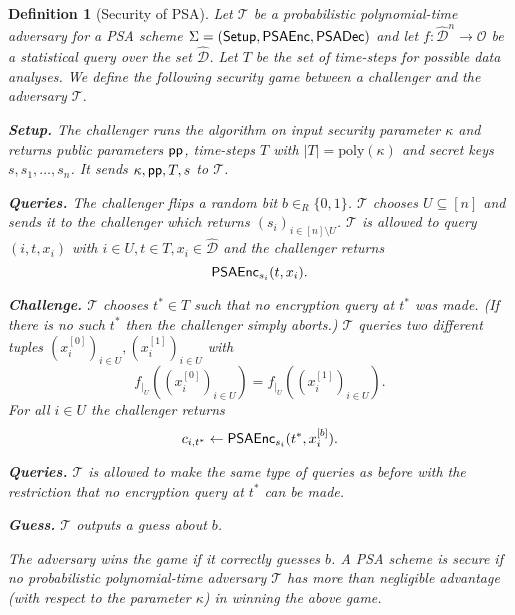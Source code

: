 \documentclass[10pt]{extarticle}
\newtheorem{Def}{Definition}
\begin{document}
\begin{Def}[Security of PSA]\label{securitygame}
Let $\mathcal{T}$ be a probabilistic polynomial-time adversary for a PSA scheme $\Sigma=(\mbox{\upshape\sffamily Setup}, \mbox{\upshape\sffamily PSAEnc}, \mbox{\upshape\sffamily PSADec})$ and let $f:\widehat{\mathcal{D}}^n\to\mathcal{O}$ be a statistical query over the set $\widehat{\mathcal{D}}$. Let $T$ be the set of time-steps for possible data analyses. We define the following security game between a challenger and the adversary $\mathcal{T}$.
\begin{description}
 \item\textbf{Setup.} The challenger runs the  algorithm on input security parameter $\kappa$ and returns public parameters $\mbox{\upshape\sffamily pp}$, time-steps $T$ with $|T|=\text{poly}(\kappa)$ and secret keys $s,s_1,\ldots,s_n$. It sends $\kappa,\mbox{\upshape\sffamily pp}, T, s$ to $\mathcal{T}$.
\item\textbf{Queries.} The challenger flips a random bit $b\in_R\{0,1\}$. $\mathcal{T}$ chooses $U\subseteq[n]$ and sends it to the challenger which returns $(s_i)_{i\in[n]\setminus U}$.
 $\mathcal{T}$ is allowed to query $(i,t,x_i)$ with $i\in U, t\in T, x_i\in\widehat{\mathcal{D}}$ and the challenger returns \[\mbox{\upshape\sffamily PSAEnc}_{s_i}(t,x_i).\]
\item\textbf{Challenge.} $\mathcal{T}$ chooses $t^*\in T$ such that no encryption query at $t^*$ was made. (If there is no such $t^*$ then the challenger simply aborts.) $\mathcal{T}$ queries two different tuples $(x_i^{[0]})_{i\in U},(x_i^{[1]})_{i\in U}$ with
\[f_{|_U}((x_i^{[0]})_{i\in U})=f_{|_U}((x_i^{[1]})_{i\in U}).\] 
For all $i\in U$ the challenger returns 
\[c_{i,t^*}\leftarrow\mbox{\upshape\sffamily PSAEnc}_{s_i}(t^*,x_i^{[b]}).\]
\item\textbf{Queries.} $\mathcal{T}$ is allowed to make the same type of queries as before with the restriction that no encryption query at $t^*$ can be made.
\item\textbf{Guess.} $\mathcal{T}$ outputs a guess about $b$.
\end{description}
The adversary wins the game if it correctly guesses $b$. A PSA scheme is secure if no probabilistic polynomial-time adversary $\mathcal{T}$ has more than negligible advantage (with respect to the parameter $\kappa$) in winning the above game.
\end{Def}
\end{document}
